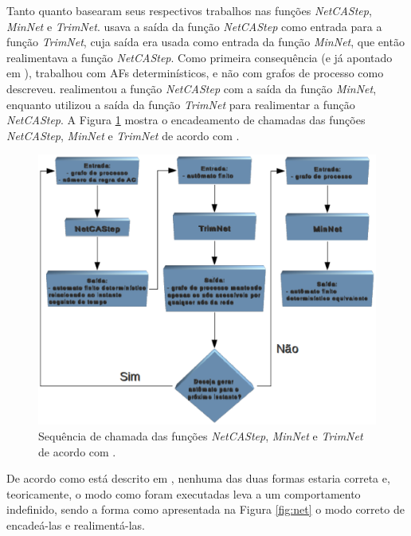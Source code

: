\documentclass[12pt,a4paper]{article}
\begin{document}
Tanto  quanto  basearam seus
respectivos trabalhos nas funções \emph{NetCAStep}, \emph{MinNet} e \emph{TrimNet}.
 usava a saída da função \emph{NetCAStep} como entrada
para a função \emph{TrimNet}, cuja saída era usada como entrada da função
\emph{MinNet}, que então realimentava a função \emph{NetCAStep}. Como primeira
consequência (e já apontado em ),
 trabalhou com AFs determinísticos, e não com
grafos de processo como descreveu.  realimentou
a função \emph{NetCAStep} com a saída da função \emph{MinNet}, enquanto
 utilizou a saída da função \emph{TrimNet} para realimentar
a função \emph{NetCAStep}. A Figura \ref{fig:net-miki} mostra o encadeamento de
chamadas das funções \emph{NetCAStep}, \emph{MinNet} e \emph{TrimNet} de acordo com
.

\begin{figure}[htp]
\begin{center}
\includegraphics[scale=0.8]{img/net-miki.eps}
\caption{Sequência de chamada das funções \emph{NetCAStep}, \emph{MinNet} e \emph{TrimNet} de
acordo com .}
\label{fig:net-miki}
\end{center}
\end{figure}

De acordo como está descrito em
, nenhuma das duas formas estaria correta e,
teoricamente, o modo como foram executadas leva a um comportamento indefinido,
sendo a forma como apresentada na Figura \ref{fig:net} o modo correto de
encadeá-las e realimentá-las.
\end{document}
